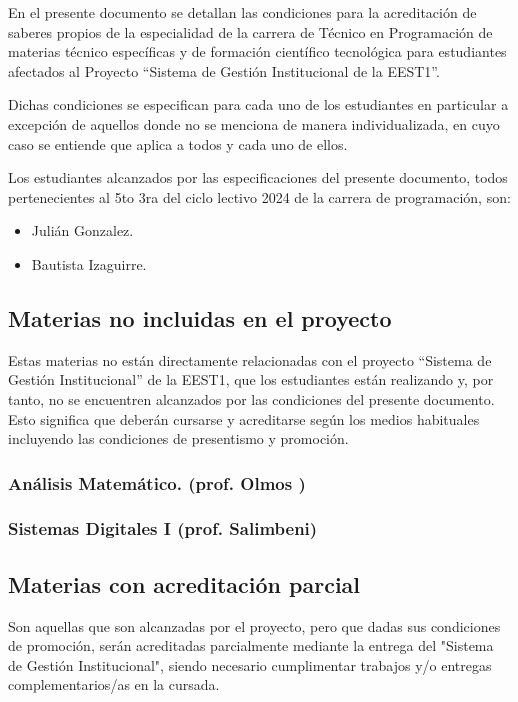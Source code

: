 En el presente documento se detallan las condiciones para la acreditación de saberes propios de la especialidad de la carrera de Técnico en Programación de materias técnico específicas y de formación científico tecnológica para estudiantes afectados al Proyecto “Sistema de Gestión Institucional de la EEST1”.

Dichas condiciones se especifican para cada uno de los estudiantes en particular a excepción de aquellos donde no se menciona de manera individualizada, en cuyo caso se entiende que aplica a todos y cada uno de ellos. 

Los estudiantes alcanzados por las especificaciones del presente documento, todos pertenecientes al 5to 3ra del ciclo lectivo 2024 de la carrera de programación, son:

    \begin{itemize}
        \item Julián Gonzalez.
        \item Bautista Izaguirre.
    \end{itemize}

\subsection{Materias no incluidas en el proyecto}

Estas materias no están directamente relacionadas con el proyecto “Sistema de Gestión Institucional” de la EEST1,  que los estudiantes están realizando y, por tanto, no se encuentren alcanzados por las condiciones del presente documento. Esto significa que deberán cursarse y acreditarse según los medios habituales incluyendo las condiciones de presentismo y promoción.

\subsubsection{Análisis Matemático. (prof. Olmos )}
\subsubsection{Sistemas Digitales I (prof. Salimbeni)}

\subsection{Materias con acreditación parcial}

Son aquellas que son alcanzadas por el proyecto, pero que dadas sus condiciones de promoción, serán acreditadas parcialmente mediante la entrega del "Sistema de Gestión Institucional", siendo necesario cumplimentar trabajos y/o entregas complementarios/as en la cursada.

